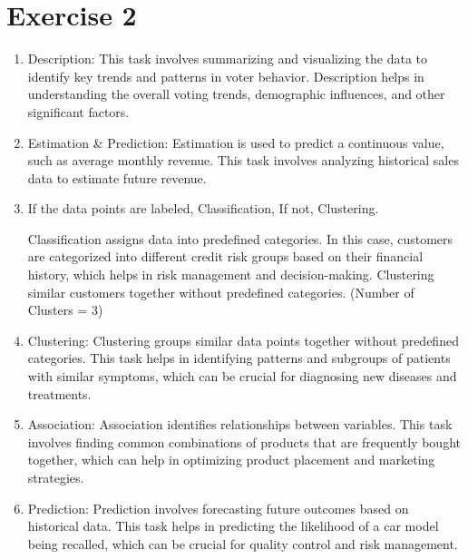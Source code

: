 \documentclass[12pt]{article}
\begin{document}
	
	\section{Exercise 2}
			\begin{enumerate}
				\item Description: 
				This task involves summarizing and visualizing the data to identify key trends and patterns in voter behavior. Description helps in understanding the overall voting trends, demographic influences, and other significant factors.
				
				\item Estimation \& Prediction: Estimation is used to predict a continuous value, such as average monthly revenue. This task involves analyzing historical sales data to estimate future revenue.
				
				\item If the data points are labeled, Classification, If not, Clustering.
				
				\subitem Classification assigns data into predefined categories. In this case, customers are categorized into different credit risk groups based on their financial history, which helps in risk management and decision-making.
				\subitem Clustering similar customers together without predefined categories. (Number of Clusters = 3)
				
				\item Clustering: Clustering groups similar data points together without predefined categories. This task helps in identifying patterns and subgroups of patients with similar symptoms, which can be crucial for diagnosing new diseases and treatments.
				
				\item Association: Association identifies relationships between variables. This task involves finding common combinations of products that are frequently bought together, which can help in optimizing product placement and marketing strategies.

				\item Prediction: Prediction involves forecasting future outcomes based on historical data. This task helps in predicting the likelihood of a car model being recalled, which can be crucial for quality control and risk management.
				

			\end{enumerate}

	
\end{document}

